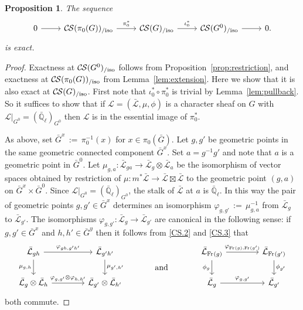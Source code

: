 \documentclass[10pt]{amsart}
\theoremstyle{plain}
\newtheorem{proposition}[theorem]{Proposition}
\theoremstyle{definition}
\newcommand{\EE}{\mathbb{\bar Q}_\ell}
\newcommand{\Frob}[1]{\operatorname{Fr}_{#1}}
\newcommand{\ceq}{{\, :=\, }}
\newcommand{\cs}[1]{{\mathcal{#1}}}
\newcommand{\gcs}[1]{{\mathcal{\bar #1}}}
\newcommand{\CS}{{\mathcal{C\hskip-0.8pt S}}}
\newcommand{\CSiso}[1]{\CS(#1)_{/\text{iso}}}
\newcommand{\bG}{\bar{G}}
\begin{document}
\begin{proposition}\label{prop:middleexact}
 The sequence
 \[
  \begin{tikzcd}
  0 \rar & \CSiso{\pi_0(G)} \arrow{r}{\pi_0^*} & \CSiso{G} \arrow{r}{\iota_0^*} & \CSiso{G^0} \rar & 0.
  \end{tikzcd}
 \]
 is exact.
\end{proposition}

\begin{proof}
Exactness at $\CSiso{G^0}$ follows from Proposition~\ref{prop:restriction},
and exactness at $\CSiso{\pi_0(G)}$ from Lemma~\ref{lem:extension}.
Here we show that it is also exact at $\CSiso{G}$.
First note that $\iota_0^* \circ \pi_0^*$ is trivial by Lemma~\ref{lem:pullback}.
So it suffices to show that if $\cs{L} = (\gcs{L},\mu,\phi)$ is a character sheaf on $G$
with $\cs{L}\vert_{G^0} = (\EE)_{G^0}$ then $\cs{L}$ is in the essential image of $\pi_0^*$.

As above, set $\bG^x \ceq \pi_0^{-1}(x)$ for $x\in \pi_0(\bG)$.
Let $g, g'$ be geometric points in the same
geometric connected component $\bG^x$.
Set $a = g^{-1}g'$ and note that $a$ is a geometric point in $\bG^0$.
Let $\mu_{g,a} : \gcs{L}_{ga} \to \gcs{L}_g \otimes \gcs{L}_a$
be the isomorphism of vector spaces obtained by restriction of
$\mu : m^*\gcs{L} \to \gcs{L} \boxtimes \gcs{L}$ to the
geometric point $(g,a)$ on $\bG^x \times \bG^0$.
Since $\cs{L}\vert_{G^0} = (\EE)_{G^0}$,
the stalk of $\gcs{L}$ at $a$ is $\EE$.
In this way the pair of geometric points $g, g' \in \bG^x$
determines an isomorphism $\varphi_{g,g'} \ceq \mu_{g,a}^{-1}$
from $\gcs{L}_{g}$ to $\gcs{L}_{g'}$.
%
The isomorphisms $\varphi_{g,g'}: \gcs{L}_{g} \to \gcs{L}_{g'}$ are canonical
in the following sense: if $g,g'\in \bG^x$ and $h,h'\in \bG^y$
then it follows from \ref{CS.2} and \ref{CS.3}
that
 \begin{equation}\label{eq:CS}
  \begin{tikzcd}[column sep=40]
   \gcs{L}_{gh} \arrow{r}{\varphi_{gh,g'h'}} \arrow[swap]{d}{\mu_{g,h}}
  & \gcs{L}_{g'h'} \arrow{d}{\mu_{g',h'}}
  &\arrow[draw=none]{d}[pos=.4,description]{\text{\normalsize{and}}}
  &  \gcs{L}_{\Frob{}(g)} \arrow{r}{\varphi_{\Frob{}(g),\Frob{}(g')}} \arrow[swap]{d}{\phi_{g}} & \gcs{L}_{\Frob{}(g')} \arrow{d}{\phi_{g'}} \\
  \gcs{L}_{g} \otimes \gcs{L}_{h} \arrow{r}{\varphi_{g,g'}\otimes \varphi_{h,h'}}
  & \gcs{L}_{g'} \otimes \gcs{L}_{h'}
  & {}
  & \gcs{L}_{g} \arrow{r}{\varphi_{g,g'}} & \gcs{L}_{g'}
  \end{tikzcd}
 \end{equation}
both commute.


\end{proof}
\end{document}
